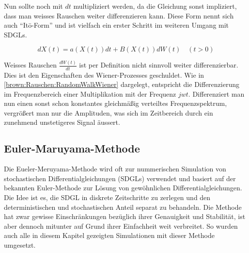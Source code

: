 Nun sollte noch mit $ dt $  multipliziert werden, da die Gleichung sonst impliziert, dass man weisses Rauschen weiter differenzieren kann. Diese Form nennt sich auch ``Itō-Form'' und ist vielfach ein erster Schritt im weiteren Umgang mit SDGLs.

\begin{equation}
	dX(t) = a(X(t)) dt + B(X(t)) dW(t) \quad (t>0)
\end{equation}

Weisses Rauschen $ \frac{dW(t)}{dt} $ ist per Definition nicht sinnvoll weiter differenzierbar. Dies ist den Eigenschaften des Wiener-Prozesses geschuldet. Wie in \ref{brown:Rauschen:RandomWalkWiener} dargelegt, entspricht die Differenzierung im Frequenzbereich einer Multiplikation mit der Frequenz $ jwt $. Differenziert man nun einen sonst schon konstantes gleichmäßig verteiltes Frequenzspektrum, vergrößert man nur die Amplituden, was sich im Zeitbereich durch ein zunehmend unstetigeres Signal äussert.



\subsection{Euler-Maruyama-Methode\label{brown:Simulation}}

Die Eueler-Meruyama-Methode wird oft zur nummerischen Simulation von stochastischen Differentialgleichungen (SDGLs) verwendet und basiert auf der bekannten Euler-Methode zur Lösung von gewöhnlichen Differentialgleichungen. Die Idee ist es, die SDGL in diskrete Zeitschritte zu zerlegen und den deterministischen und stochastischen Anteil separat zu behandeln. Die Methode hat zwar gewisse Einschränkungen bezüglich ihrer Genauigkeit und Stabilität, ist aber dennoch mitunter auf Grund ihrer Einfachheit weit verbreitet. So wurden auch alle in diesem Kapitel gezeigten Simulationen mit dieser Methode umgesetzt. 





